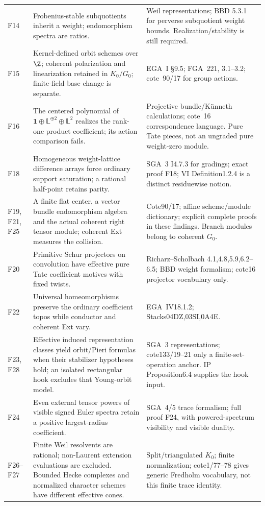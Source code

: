 {\begin{longtable}{p{.12\linewidth}p{.48\linewidth}p{.32\linewidth}}
F14&Frobenius-stable subquotients inherit a weight; endomorphism spectra are ratios.&Weil representations; BBD 5.3.1 for perverse subquotient weight bounds. Realization/stability is still required.\\
F15&Kernel-defined orbit schemes over $\Z$; coherent polarization and linearization retained in $K_0/G_0$; finite-field base change is separate.&EGA~I \S9.5; FGA~221, 3.1--3.2; cote~90/17 for group actions.\\
F16&The centered polynomial of $\mathbf1\oplus\mathbb L^{\oplus2}\oplus\mathbb L^2$ realizes the rank-one product coefficient; its action comparison fails.&Projective bundle/K\"unneth calculations; cote~16 correspondence language. Pure Tate pieces, not an ungraded pure weight-zero module.\\
F18&Homogeneous weight-lattice difference arrays force ordinary support saturation; a rational half-point retains parity.&SGA~3 I4.7.3 for gradings; exact proof F18; VI Definition1.2.4 is a distinct residuewise notion.\\
F19, F21, F25&A finite flat center, a vector bundle endomorphism algebra and the actual coherent right tensor module; coherent Ext measures the collision.&Cote90/17; affine scheme/module dictionary; explicit complete proofs in these findings. Branch modules belong to coherent $G_0$.\\
F20&Primitive Schur projectors on convolution have effective pure Tate coefficient motives with fixed twists.&Richarz--Scholbach 4.1,4.8,5.9,6.2--6.5; BBD weight formalism; cote16 projector vocabulary only.\\
F22&Universal homeomorphisms preserve the ordinary coefficient topos while conductor and coherent Ext vary.&EGA~IV18.1.2; Stacks04DZ,03SI,0A4E.\\
F23, F28&Effective induced representation classes yield orbit/Pieri formulas when their stabilizer hypotheses hold; an isolated rectangular hook excludes that Young-orbit model.&SGA~3 representations; cote133/19--21 only a finite-set-operation anchor. IP Proposition6.4 supplies the hook input.\\
F24&Even external tensor powers of visible signed Euler spectra retain a positive largest-radius coefficient.&SGA~4/5 trace formalism; full proof F24, with powered-spectrum visibility and visible duality.\\
F26--F27&Finite Weil resolvents are rational; non-Laurent extension evaluations are excluded. Bounded Hecke complexes and normalized character schemes have different effective cones.&Split/triangulated $K_0$; finite normalization; cote1/77--78 gives generic Fredholm vocabulary, not this finite trace identity.\\\bottomrule
\end{longtable}}

